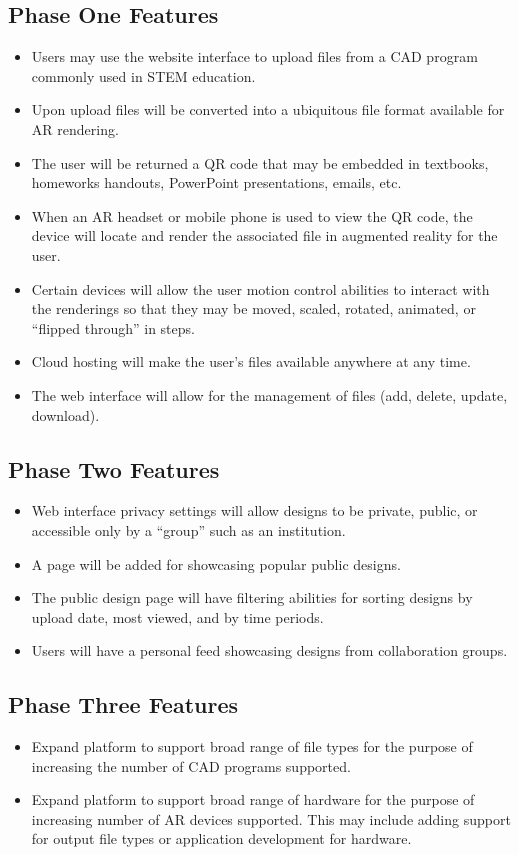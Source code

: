\subsection{Phase One Features}
\begin{itemize}
	\item Users may use the website interface to upload files from a CAD program commonly used in STEM education. 
	\item  Upon upload files will be converted into a ubiquitous file format available for AR rendering. 
	\item The user will be returned a QR code that may be embedded in textbooks, homeworks handouts, PowerPoint presentations, emails, etc. 
	\item When an AR headset or mobile phone is used to view the QR code, the device will locate and render the associated file in augmented reality for the user.  
	\item Certain devices will allow the user motion control abilities to interact with the renderings so that they may be moved, scaled, rotated, animated, or “flipped through” in steps. 
	\item Cloud hosting will make the user’s files available anywhere at any time. 
	\item The web interface will allow for the management of files (add, delete, update, download). 
\end{itemize}

\subsection{Phase Two Features}
\begin{itemize}
	\item Web interface privacy settings will allow designs to be private, public, or accessible only by a “group” such as an institution. 
	\item A page will be added for showcasing popular public designs. 
	\item The public design page will have filtering abilities for sorting designs by upload date, most viewed, and by time periods. 
	\item Users will have a personal feed showcasing designs from collaboration groups. 
\end{itemize}

\subsection{Phase Three Features}
\begin{itemize}
	\item Expand platform to support broad range of file types for the purpose of increasing the number of CAD programs supported. 
	\item Expand platform to support broad range of hardware for the purpose of increasing number of AR devices supported. This may include adding support for output file types or application development for hardware. 
\end{itemize}


